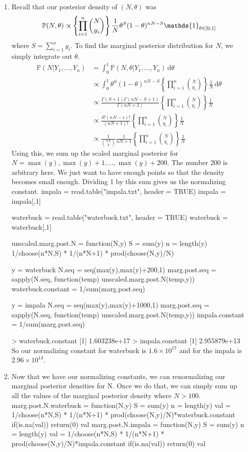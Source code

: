 \documentclass[letterpaper,10pt]{amsart}
\newcommand{\sumin}{\sum_{i=1}^n}
\newcommand{\prodin}{\prod_{i=1}^n}
\newcommand{\rmd}{\mathrm{d}}
\newcommand{\p}[1]{\mathbb{P}\!\left(#1\right)}
\newenvironment{verbatimcode}{\bigskip \scriptsize \verbatim}{\endverbatim \normalsize \bigskip}
\begin{document}
\begin{enumerate}[{1}.1]
\item
Recall that our posterior density of $(N,\theta)$ was 
\[\p{N, \theta} \propto \left\{\prodin \binom{N}{y_i}\right\}\frac{1}{N} \theta^S (1-\theta)^{nN-S} \mathds{1}_{\theta \in [0,1]}\\ \]
where $S = \sumin y_i$. To find the marginal posterior distribution for $N$, we simply integrate out $\theta$. 
\begin{align*}
\p{N | Y_1, \ldots, Y_n} &= \int_0^1 \! \p{N, \theta | Y_1, \ldots, Y_n} \, \rmd \theta\\
&\propto \int_0^1 \! \theta^S (1-\theta)^{nN - S} \left\{\prodin \binom{N}{y_i}\right\}\frac{1}{N}  \, \rmd \theta\\
&\propto \frac{\Gamma(S+1) \Gamma(nN - S + 1)}{\Gamma(nN+2)}\left\{\prodin \binom{N}{y_i}\right\}\frac{1}{N} \\
&\propto \frac{S!(nN-s)!}{(nN+1)!} \left\{\prodin \binom{N}{y_i}\right\}\frac{1}{N}\\
&\propto \frac{1}{\binom{nN}{S}}\frac{1}{nN+1} \left\{\prodin \binom{N}{y_i}\right\}\frac{1}{N}
\end{align*}
Using this, we sum up the scaled marginal posterior for $N=\max(y), \max(y)+1, \ldots, \max(y)+200$. The number 200 is arbitrary here. We just want to have enough points so that the density becomes small enough. Dividing 1 by this sum gives us the normalizing constant. 
\begin{verbatimcode}
impala = read.table("impala.txt", header = TRUE)
impala = impala[,1]

waterbuck = read.table("waterbuck.txt", header = TRUE)
waterbuck = waterbuck[,1]

unscaled.marg.post.N = function(N,y)
{
  S = sum(y)
  n = length(y)
  1/choose(n*N,S) * 1/(n*N+1) * prod(choose(N,y)/N)
}

y = waterbuck
N.seq = seq(max(y),max(y)+200,1)
marg.post.seq = sapply(N.seq, function(temp) unscaled.marg.post.N(temp,y))
waterbuck.constant = 1/sum(marg.post.seq)

y = impala
N.seq = seq(max(y),max(y)+1000,1)
marg.post.seq = sapply(N.seq, function(temp) unscaled.marg.post.N(temp,y))
impala.constant = 1/sum(marg.post.seq)

> waterbuck.constant
[1] 1.603238e+17
> impala.constant
[1] 2.955879e+13
\end{verbatimcode}
So our normalizing constant for waterbuck is $1.6 \times 10^{17}$ and for the impala is $2.96 \times 10^{13}$.


\item
Now that we have our normalizing constants, we can renormalizing our marginal posterior densities for N. Once we do that, we can simply sum up all the values of the marginal posterior density where $N>100$. 
\begin{verbatimcode}
marg.post.N.waterbuck = function(N,y)
{
  S = sum(y)
  n = length(y)
  val = 1/choose(n*N,S) * 1/(n*N+1) * prod(choose(N,y)/N)*waterbuck.constant
  if(is.na(val))
    return(0)
  val
}
marg.post.N.impala = function(N,y)
{
  S = sum(y)
  n = length(y)
  val = 1/choose(n*N,S) * 1/(n*N+1) * prod(choose(N,y)/N)*impala.constant
  if(is.na(val))
    return(0)
  val
}


\end{verbatimcode}
\end{enumerate}
\end{document}
